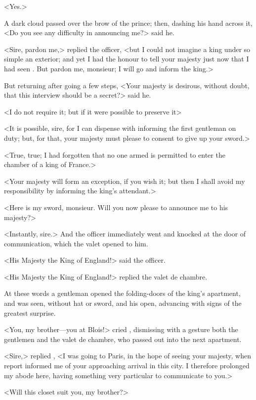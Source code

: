 <Yes.>

A dark cloud passed over the brow of the prince; then, dashing his hand across it, <Do you see any difficulty in announcing me?> said he.

<Sire, pardon me,> replied the officer, <but I could not imagine a king under so simple an exterior; and yet I had the honour to tell your majesty just now that I had seen \@. But pardon me, monsieur; I will go and inform the king.>

But returning after going a few steps, <Your majesty is desirous, without doubt, that this interview should be a secret?> said he.

<I do not require it; but if it were possible to preserve it\longdash>

<It is possible, sire, for I can dispense with informing the first gentleman on duty; but, for that, your majesty must please to consent to give up your sword.>

<True, true; I had forgotten that no one armed is permitted to enter the chamber of a king of France.>

<Your majesty will form an exception, if you wish it; but then I shall avoid my responsibility by informing the king's attendant.>

<Here is my sword, monsieur. Will you now please to announce me to his majesty?>

<Instantly, sire.> And the officer immediately went and knocked at the door of communication, which the valet opened to him.

<His Majesty the King of England!> said the officer.

<His Majesty the King of England!> replied the valet de chambre.

At these words a gentleman opened the folding-doors of the king's apartment, and  was seen, without hat or sword, and his  open, advancing with signs of the greatest surprise.

<You, my brother—you at Blois!> cried , dismissing with a gesture both the gentlemen and the valet de chambre, who passed out into the next apartment.

<Sire,> replied , <I was going to Paris, in the hope of seeing your majesty, when report informed me of your approaching arrival in this city. I therefore prolonged my abode here, having something very particular to communicate to you.>

<Will this closet suit you, my brother?>

